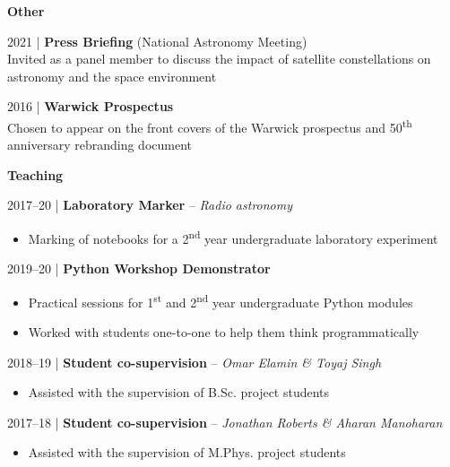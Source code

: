 \documentclass[10pt,a4paper]{altacv}
\begin{document}
\divider

\normalsize \textbf{Other}


\medskip

\small 2021 | \textbf{Press Briefing} (National Astronomy Meeting) \\
Invited as a panel member to discuss the impact of satellite constellations on astronomy and the space environment

\smallskip

\small 2016 | \textbf{Warwick Prospectus} \\
Chosen to appear on the front covers of the Warwick prospectus and 50\textsuperscript{th} anniversary rebranding document

\medskip


\normalsize \textbf{Teaching}

\medskip

\small 2017--20 | \textbf{Laboratory Marker} -- \textit{Radio astronomy} \\
\smallskip
\begin{itemize}
	\item Marking of notebooks for a 2\textsuperscript{nd} year undergraduate laboratory experiment
\end{itemize}

\smallskip

\small 2019--20 | \textbf{Python Workshop Demonstrator} \\
\smallskip
\begin{itemize}
	\item Practical sessions for 1\textsuperscript{st} and 2\textsuperscript{nd} year undergraduate Python modules
	\item Worked with students one-to-one to help them think programmatically
\end{itemize}

\smallskip

\small 2018--19 | \textbf{Student co-supervision} -- \textit{Omar Elamin \& Toyaj Singh} \\
\smallskip
\begin{itemize}
	\item Assisted with the supervision of B.Sc. project students
\end{itemize}

\smallskip

\small 2017--18 | \textbf{Student co-supervision} -- \textit{Jonathan Roberts \& Aharan Manoharan} \\
\smallskip
\begin{itemize}
	\item Assisted with the supervision of M.Phys. project students
\end{itemize}
\end{document}
